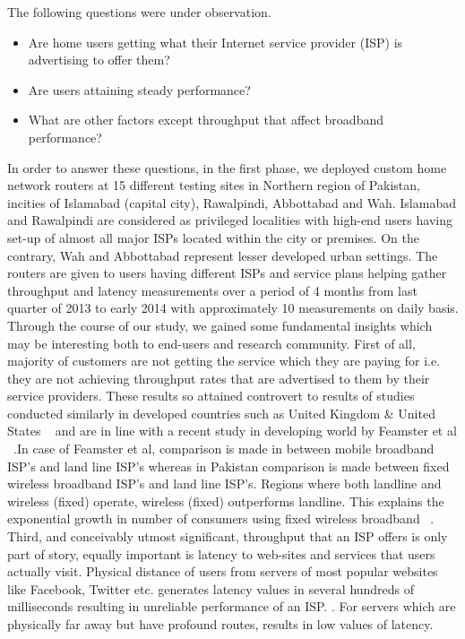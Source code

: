 \documentclass{sig-alternate-10pt}
\begin{document}
\begin{sloppypar}
\indent The following questions were under observation.
\begin{itemize}
  \item Are home users getting what their Internet service provider (ISP) is advertising to offer them?
  \item Are users attaining steady performance?
  \item What are other factors except throughput that affect broadband performance?
\end{itemize}
\indent In order to answer these questions, in the first phase, we deployed custom home network routers at 15 different testing sites in Northern region of Pakistan, incities of Islamabad (capital city), Rawalpindi, Abbottabad and Wah. Islamabad and Rawalpindi are considered as privileged localities with high-end users having set-up of almost all major ISPs located within the city or premises. On the contrary, Wah and Abbottabad represent lesser developed urban settings. The routers are given to users having different ISPs and service plans helping gather throughput and latency measurements over a period of 4 months from last quarter of 2013 to early 2014 with approximately 10 measurements on daily basis. \\
\indent Through the course of our study, we gained some fundamental insights which may be interesting both to end-users and research community. First of all, majority of customers are not getting the service which they are paying for i.e. they are not achieving throughput rates that are advertised to them by their service providers. These results so attained controvert to results of studies conducted similarly in developed countries such as United Kingdom \& United States ~\cite{16} and are in line with a recent study in developing world by Feamster et al ~\cite{26}.In case of Feamster et al, comparison is made in between mobile broadband ISP’s and land line ISP’s whereas in Pakistan comparison is made between fixed wireless broadband ISP’s and land line ISP’s. Regions where both landline and wireless (fixed) operate, wireless (fixed) outperforms landline. This explains the exponential growth in number of consumers using fixed wireless broadband ~\cite{28}. Third, and conceivably utmost significant, throughput that an ISP offers is only part of story, equally important is latency to web-sites and services that users actually visit. Physical distance of users from servers of most popular websites like Facebook, Twitter etc. generates latency values in several hundreds of milliseconds resulting in unreliable performance of an ISP. . For servers which are physically far away but have profound routes, results in low values of latency. \\

\end{sloppypar}
\end{document}
